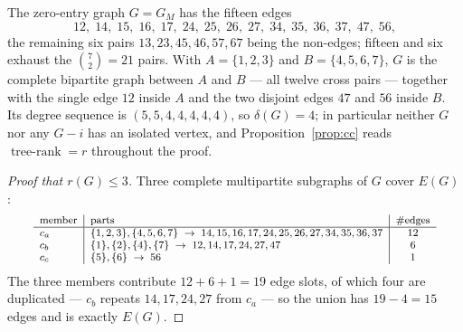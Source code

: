 \documentclass[11pt]{amsart}
\theoremstyle{remark}
\DeclareMathOperator{\trank}{tree\text{-}rank}
\newcommand{\GM}{G_M}
\begin{document}
The zero-entry graph $G=\GM$ has the fifteen edges
\[
 12,\;14,\;15,\;16,\;17,\;24,\;25,\;26,\;27,\;34,\;35,\;36,\;37,\;47,\;56,
\]
the remaining six pairs $13,23,45,46,57,67$ being the non-edges; fifteen and six exhaust the
$\binom72=21$ pairs. With $A=\{1,2,3\}$ and $B=\{4,5,6,7\}$, $G$ is the complete bipartite
graph between $A$ and $B$ --- all twelve cross pairs --- together with the single edge $12$
inside $A$ and the two disjoint edges $47$ and $56$ inside $B$. Its degree sequence is
$(5,5,4,4,4,4,4)$, so $\delta(G)=4$; in particular neither $G$ nor any $G-i$ has an isolated
vertex, and Proposition~\ref{prop:cc} reads $\trank=r$ throughout the proof.

\begin{proof}[Proof that $r(G)\le3$]
Three complete multipartite subgraphs of $G$ cover $E(G)$:
\[
\footnotesize
\begin{array}{l|l|c}
 \text{member} & \text{parts} & \#\text{edges}\\\hline
 c_a & \{1,2,3\},\{4,5,6,7\} \;\to\; 14,15,16,17,24,25,26,27,34,35,36,37 & 12\\
 c_b & \{1\},\{2\},\{4\},\{7\} \;\to\; 12,14,17,24,27,47 & 6\\
 c_c & \{5\},\{6\} \;\to\; 56 & 1
\end{array}
\]
The three members contribute $12+6+1=19$ edge slots, of which four are duplicated ---
$c_b$ repeats $14,17,24,27$ from $c_a$ --- so the union has $19-4=15$ edges and is exactly
$E(G)$.
\end{proof}
\end{document}
